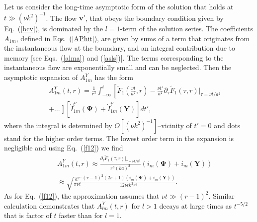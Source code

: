 \documentclass[aps,prx,twocolumn,amsmath,amssymb,amsfonts]{revtex4-2}
\begin{document}
Let us consider the long-time asymptotic form of the solution that holds at $t\gg (\nu k^2)^{-1}$. The flow $\bm v'$, that obeys the boundary condition given by Eq.~(\ref{bcv}), is dominated by the $l\!=\!1$-term of the solution series. The coefficients $A_{1m}$, defined in Eqs.~(\ref{APhit}), are given by sums of a term that originates from the instantaneous flow at the boundary, and an integral contribution due to memory [see Eqs.~(\ref{alma}) and (\ref{asls})]. The terms corresponding to the instantaneous flow are exponentially small and can be neglected. Then the asymptotic expansion of $A^Y_{1m}$ has the form
\begin{eqnarray}&&
A_{1m}^{Y}(t, r)\! = \!\frac{1}{r^3}\int_{-\infty}^t\! \left[{\tilde F}_1\left(\frac{\nu t}{a^2}, r\right)\!-\!\frac{\nu t'}{a^2}\partial_{\tau}{\tilde F}_1(\tau, r)|_{\tau=\nu t/a^2}
\right.\nonumber\\&&\left.
+\ldots \frac{}{}\right][\dot{I}_{1m}^{t'}(\bm \Psi) \!+\!  \dot{I}_{1m}^{t'}(\bm Y)]dt',
\end{eqnarray}
where the integral is determined by $O[(\nu k^2)^{-1}]$--vicinity of $t'=0$ and dots stand for the higher order terms. The lowest order term in the expansion is negligible and using Eq.~(\ref{f12}) we find
\begin{eqnarray}&&\!\!\!\!\!
A_{1m}^{Y}(t, r)\! \approx \!\frac{\partial_{\tau}{\tilde F}_1(\tau, r)|_{\tau=\nu t/a^2}}{r^3(ka)^2} \left(i_m(\bm \Psi) \!+\! i_m(\bm Y)\right)
\nonumber\\&&\!\!\!\!\!
\approx \sqrt{\frac{a^2}{\pi\nu t}}\frac{(r\!-\!1)^2(2r\!+\!1)\left(i_m(\bm \Psi) \!+\! i_m(\bm Y)\right)}{12\nu t k^2 r^3}. \label{a1m}
\end{eqnarray}
As for Eq.~(\ref{f12}), the approximation assumes that $\nu t\gg (r-1)^2$. Similar calculation demonstrates that $A_{lm}^{Y}(t, r)$ for $l>1$ decays at large times as $t^{-5/2}$ that is factor of $t$ faster than for $l=1$.
\end{document}
